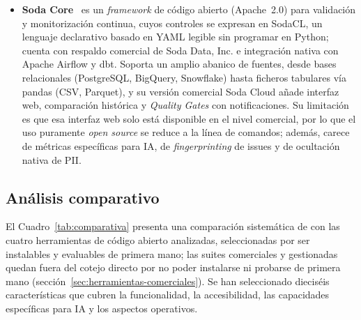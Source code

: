 \begin{itemize}
  \item \textbf{Soda Core}~\citep{sodacore} es un \emph{framework} de código
    abierto (Apache~2.0) para validación y monitorización continua, cuyos
    controles se expresan en \ac{SodaCL}, un lenguaje declarativo basado en
    \ac{YAML} legible sin programar en Python; cuenta con respaldo comercial de
    Soda Data, Inc. e integración nativa con Apache Airflow y dbt. Soporta un
    amplio abanico de fuentes, desde bases relacionales (PostgreSQL, BigQuery,
    Snowflake) hasta ficheros tabulares vía pandas (\ac{CSV}, Parquet), y su
    versión comercial Soda Cloud añade interfaz web, comparación histórica y
    \emph{Quality Gates} con notificaciones. Su limitación es que esa interfaz
    web solo está disponible en el nivel comercial, por lo que el uso puramente
    \emph{open source} se reduce a la línea de comandos; además, carece de
    métricas específicas para \ac{IA}, de \emph{fingerprinting} de issues y de
    ocultación nativa de \ac{PII}.
\end{itemize}

\subsection{Análisis comparativo}
\label{sec:analisis-comparativo}

El Cuadro~\ref{tab:comparativa} presenta una comparación sistemática de
\dataqual con las cuatro herramientas de código abierto analizadas,
seleccionadas por ser instalables y evaluables de primera mano; las suites
comerciales y gestionadas quedan fuera del cotejo directo por no poder
instalarse ni probarse de primera mano (sección~\ref{sec:herramientas-comerciales}).
Se han seleccionado dieciséis características que cubren la funcionalidad, la
accesibilidad, las capacidades específicas para \ac{IA} y los aspectos
operativos.

